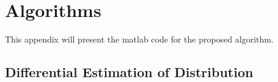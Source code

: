 \section{Algorithms}
\label{appendix:algorithms}

This appendix will present the matlab code for the proposed algorithm.

\subsection{Differential Estimation of Distribution}


